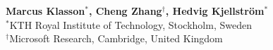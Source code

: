 




\chapter{
}\label{paperA}
\begin{comment}
\vspace{-1cm}
\large{\textbf{Marcus Klasson}} \\
\large{\textit{Robotics, Perception, and Learning, EECS}} \\
\large{\textit{KTH Royal Institute of Technology, Stockholm, Sweden}} \\

\noindent\large{\textbf{Cheng Zhang}} \\
\large{\textit{Microsoft Research}} \\
\large{\textit{Cambridge, United Kingdom}} \\

\noindent\large{\textbf{Hedvig Kjellstr\"{o}m}} \\
\large{\textit{Robotics, Perception, and Learning, EECS}} \\
\large{\textit{KTH Royal Institute of Technology, Stockholm, Sweden}} 
\end{comment}
\vspace{-5mm}
\begin{center}
\large{\textbf{Marcus Klasson$^{*}$, Cheng Zhang$^{\dagger}$, Hedvig Kjellström$^{*}$}} \\[2mm]
\small{$^{*}$KTH Royal Institute of Technology, Stockholm, Sweden} \\
\small{$^{\dagger}$Microsoft Research, Cambridge, United Kingdom} \\
\end{center}


